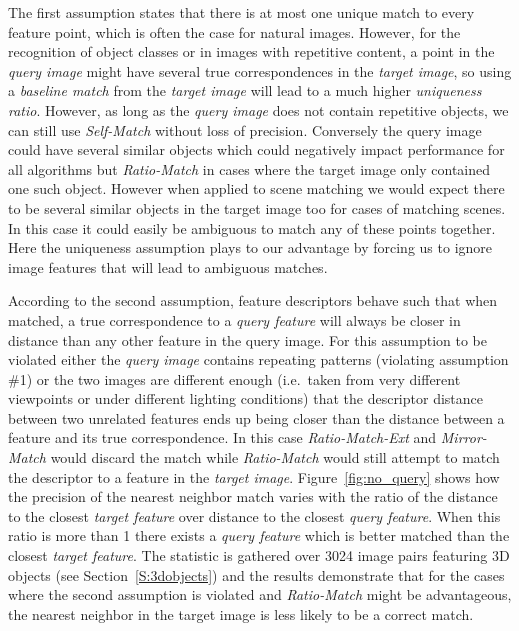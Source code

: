\documentclass[review]{elsarticle}
\begin{document}
The first assumption states that there is at most one unique match to every feature point, which is often the case for natural images. However, for the recognition of object classes or in images with repetitive content, a point in the \emph{query image} might have several true correspondences in the \emph{target image}, so using a \emph{baseline match} from the \emph{target image} will lead to a much higher \emph{uniqueness ratio}. However, as long as the \emph{query image} does not contain repetitive objects, we can still use \emph{Self-Match} without loss of precision. Conversely the query image could have several similar objects which could negatively impact performance for all algorithms but \emph{Ratio-Match} in cases where the target image only contained one such object. However when applied to scene matching we would expect there to be several similar objects in the target image too for cases of matching scenes. In this case it could easily be ambiguous to match any of these points together. Here the uniqueness assumption plays to our advantage by forcing us to ignore image features that will lead to ambiguous matches.

According to the second assumption, feature descriptors behave such that when matched, a true correspondence to a \emph{query feature} will always be closer in distance than any other feature in the query image. For this assumption to be violated either the \emph{query image} contains repeating patterns (violating assumption \#1) or the two images are different enough (i.e.\ taken from very different viewpoints or under different lighting conditions) that the descriptor distance between two unrelated features ends up being closer than the distance between a feature and its true correspondence. In this case \emph{Ratio-Match-Ext} and \emph{Mirror-Match} would discard the match while \emph{Ratio-Match} would still attempt to match the descriptor to a feature in the \emph{target image}. Figure~\ref{fig:no_query} shows how the precision of the nearest neighbor match varies with the ratio of the distance to the closest \emph{target feature} over distance to the closest \emph{query feature}. When this ratio is more than 1 there exists a \emph{query feature} which is better matched than the closest \emph{target feature}. The statistic is gathered over 3024 image pairs featuring 3D objects (see Section~\ref{S:3dobjects}) and the results demonstrate that for the cases where the second assumption is violated and \emph{Ratio-Match} might be advantageous, the nearest neighbor in the target image is less likely to be a correct match. %
\end{document}
